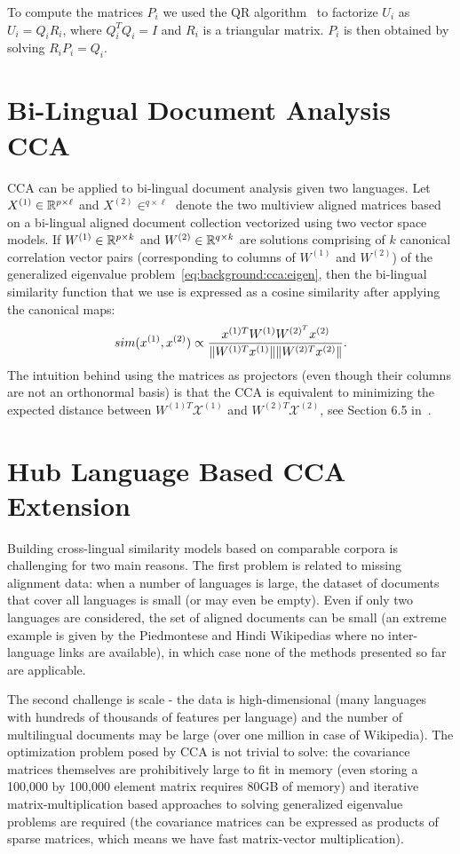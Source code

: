 To compute the matrices $P_i$ we used the QR algorithm~\cite{golub} to factorize
$U_i$ as $U_i = Q_i R_i$, where $Q_i^TQ_i = I$ and $R_i$ is a triangular matrix.
$P_i$ is then obtained by solving $R_i P_i = Q_i$.

\section{Bi-Lingual Document Analysis CCA}\label{chap:crosslingual:CCA}
CCA can be applied to bi-lingual document analysis given two languages. Let $X^{(1)} \in \mathbb{R}^{p \times \ell}$
and $X^{(2)} \in ^{q \times \ell}$ denote the two multiview aligned matrices based on a bi-lingual aligned
document collection vectorized using two vector space models.
If $W^{(1)}\in \mathbb{R}^{p\times k}$ and $W^{(2)} \in \mathbb{R}^{q\times k}$ are solutions comprising of $k$ canonical
correlation vector pairs (corresponding to columns of $W^{(1)}$ and $W^{(2)}$)
of the generalized eigenvalue problem~\ref{eq:background:cca:eigen}, then
the bi-lingual similarity function that we use is expressed as a cosine similarity
after applying the canonical maps:
$$sim(x^{(1)}, x^{(2)}) \propto \frac{x^{(1)T} W^{(1)}W^{(2)^T}x^{(2)}}{\lVert W^{(1)T}x^{(1)}\rVert \lVert W^{(2)T}x^{(2)}\rVert} .$$
The intuition behind using the matrices as projectors (even though their columns are not an
orthonormal basis) is that the CCA is equivalent to minimizing the expected
distance between $W^{(1)T}\mathcal{X}^{(1)}$ and $W^{(2)T}\mathcal{X}^{(2)}$,
see Section 6.5 in~\cite{shawe-taylor04kernel}.


\section{Hub Language Based CCA Extension}\label{chap:crosslingual:hublang}
Building cross-lingual similarity models based on comparable corpora is challenging for
two main reasons. The first problem is related to missing alignment data: when a number
of languages is large, the dataset of documents that cover all languages is small (or may
even be empty). Even if only two languages are considered, the set of aligned documents
can be small (an extreme example is given by the Piedmontese and Hindi Wikipedias where
no inter-language links are available), in which case none of the methods presented so
far are applicable.

The second challenge is scale - the data is high-dimensional (many languages with
hundreds of thousands of features per language) and the number of multilingual documents may
be large (over one million in case of Wikipedia). The optimization problem posed by CCA is not trivial
to solve: the covariance matrices themselves are prohibitively
large to fit in memory (even storing a 100,000 by 100,000 element matrix requires
80GB of memory) and iterative matrix-multiplication based approaches to solving generalized
eigenvalue problems are required (the covariance matrices can be expressed as products
of sparse matrices, which means we have fast matrix-vector multiplication).

